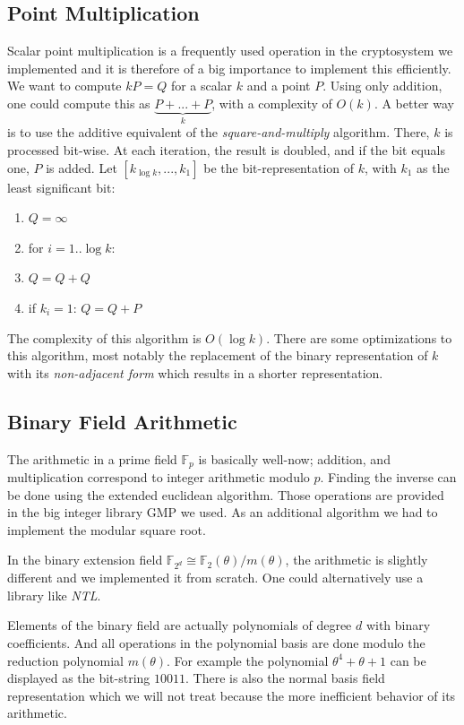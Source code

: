 \documentclass[11pt,english]{article}
\begin{document}
\subsection{Point Multiplication}
Scalar point multiplication is a frequently used operation in the cryptosystem we implemented and it is therefore of a big importance to implement this efficiently. We want to compute $kP=Q$ for a scalar $k$ and a point $P$. Using only addition, one could compute this as $\underbrace{P+...+P}_{k}$, with a complexity of $O(k)$. A better way is to use the additive equivalent of the \emph{square-and-multiply} algorithm. There, $k$ is processed bit-wise. At each iteration, the result is doubled, and if the bit equals one, $P$ is added. Let $[k_{\log{k}},...,k_1]$ be the bit-representation of $k$, with $k_1$ as the least significant bit:

\begin{enumerate}
 \item $Q=\infty$
 \item for $i=1..\log{k}$:
 \item $Q=Q+Q$
 \item if $k_i=1$: $Q=Q+P$
\end{enumerate}

The complexity of this algorithm is $O(\log{k})$. There are some optimizations to this algorithm, most notably the replacement of the binary representation of $k$ with its \emph{non-adjacent form} which results in a shorter representation. 

\subsection{Binary Field Arithmetic}
The arithmetic in a prime field $\mathbb{F}_p$ is basically well-now; addition, and multiplication correspond to integer arithmetic modulo $p$. Finding the inverse can be done using the extended euclidean algorithm. Those operations are provided in the big integer library GMP we used. As an additional algorithm we had to implement the modular square root.

In the binary extension field $\mathbb{F}_{2^d}\cong \mathbb{F}_2(\theta)/m(\theta)$, the arithmetic is slightly different and we implemented it from scratch. One could alternatively use a library like \emph{NTL}.

Elements of the binary field are actually polynomials of degree $d$ with binary coefficients. And all operations in the polynomial basis are done modulo the reduction polynomial $m(\theta)$. For example the polynomial $\theta^4+\theta+1$ can be displayed as the bit-string $10011$. There is also the normal basis field representation which we will not treat because the more inefficient behavior of its arithmetic.
\end{document}
